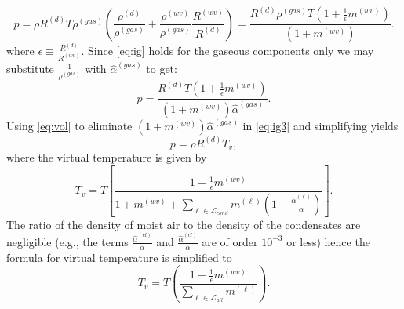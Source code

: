 \documentclass{agujournal}
\begin{document}
{\begin{equation}
p=\rho R^{(d)} T\rho^{(gas)}\left( \frac{\rho^{(d)}}{\rho^{(gas)}}+\frac{\rho^{(wv)}}{\rho^{(gas)}}\frac{R^{(wv)}}{R^{(d)}}\right)=\frac{R^{(d)} \rho^{(gas)}T\left( 1+\frac{1}{\epsilon}m^{(wv)}\right)}{\left(1+m^{(wv)}\right)}\label{eq:ig2}.
\end{equation}
where $\epsilon\equiv \frac{R^{(d)}}{R^{(wv)}}$. Since \eqref{eq:ig} holds for the gaseous components only we may substitute $\frac{1}{\rho^{(gas)}}$ with $\hat{\alpha}^{(gas)}$ to get:
\begin{equation}
p=\frac{R^{(d)} T\left( 1+\frac{1}{\epsilon}m^{(wv)}\right)}{\left(1+m^{(wv)}\right)\hat{\alpha}^{(gas)}}\label{eq:ig3}.
\end{equation}
Using \eqref{eq:vol} to eliminate $\left(1+m^{(wv)}\right)\hat{\alpha}^{(gas)}$ in \eqref{eq:ig3} and simplifying yields
\begin{equation}
p=\rho R^{(d)} T_v\label{eq:igl},
\end{equation}
where the virtual temperature is given by
\begin{equation}
T_v =T\left[ \frac{1+\frac{1}{\epsilon}m^{(wv)}}{1+m^{(wv)}+\sum_{\ell\in \mathcal{L}_{cond}}m^{(\ell)}\left(1-\frac{\hat{\alpha}^{(\ell)}}{\alpha}\right)}\right].
\end{equation}
The ratio of the density of moist air to the density of the condensates are negligible (e.g., the terms $\frac{\hat{\alpha}^{(cl)}}{\alpha}$ and $\frac{\hat{\alpha}^{(cl)}}{\alpha}$ are of order $10^{-3}$ or less) hence the formula for virtual temperature is simplified to
\begin{equation}
T_v =T\left( \frac{1+\frac{1}{\epsilon}m^{(wv)}}{\sum_{\ell \in \mathcal{L}_{all}}m^{(\ell)}}\right).\label{eq:tv}
\end{equation}
}
\end{document}
